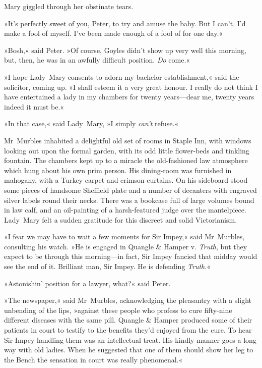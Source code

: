 Mary giggled through her obstinate tears.

»It's perfectly sweet of you, Peter, to try and amuse the baby. But I can't. I'd make a fool of myself. I've been made enough of a fool of for one day.«

»Bosh,« said Peter. »Of course, Goyles didn't show up very well this morning, but, then, he was in an awfully difficult position. \textit{Do} come.«

»I hope Lady~Mary consents to adorn my bachelor establishment,« said the solicitor, coming up. »I shall esteem it a very great honour. I really do not think I have entertained a lady in my chambers for twenty years—dear me, twenty years indeed it must be.«

»In that case,« said Lady~Mary, »I simply \textit{can't} refuse.«

Mr~Murbles inhabited a delightful old set of rooms in Staple Inn, with windows looking out upon the formal garden, with its odd little flower-beds and tinkling fountain. The chambers kept up to a miracle the old-fashioned law atmosphere which hung about his own prim person.  His dining-room was furnished in mahogany, with a Turkey carpet and crimson curtains. On his sideboard stood some pieces of handsome Sheffield plate and a number of decanters with engraved silver labels round their necks. There was a bookcase full of large volumes bound in law calf, and an oil-painting of a harsh-featured judge over the mantelpiece. Lady~Mary felt a sudden gratitude for this discreet and solid Victorianism.

»I fear we may have to wait a few moments for Sir Impey,« said Mr~Murbles, consulting his watch. »He is engaged in Quangle \& Hamper v.  \textit{Truth}, but they expect to be through this morning—in fact, Sir Impey fancied that midday would see the end of it. Brilliant man, Sir Impey.  He is defending \textit{Truth}.«

»Astonishin' position for a lawyer, what?« said Peter.

»The newspaper,« said Mr~Murbles, acknowledging the pleasantry with a slight unbending of the lips, »against these people who profess to cure fifty-nine different diseases with the same pill. Quangle \& Hamper produced some of their patients in court to testify to the benefits they'd enjoyed from the cure. To hear Sir Impey handling them was an intellectual treat. His kindly manner goes a long way with old ladies.  When he suggested that one of them should show her leg to the Bench the sensation in court was really phenomenal.«

